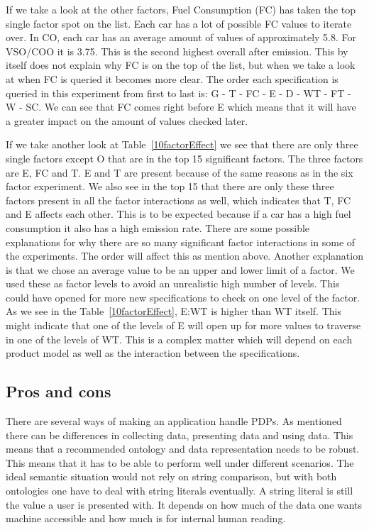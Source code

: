 \documentclass{llncs}
\begin{document}
If we take a look at the other factors, Fuel Consumption (FC) has
taken the top single factor spot on the list.  Each car has a lot of 
possible FC values to iterate
over. In CO, each car has an average amount of values of approximately
5.8. For VSO/COO it is 3.75.  This is the second highest overall after
emission. This by itself does not explain why FC is on the top of the
list, but when we take a look at when FC is queried it becomes more
clear. The order each specification is queried in this experiment 
from first to last is: G - T - FC - E - D - WT - FT - W - SC.  We can
see that FC comes right before E which means that it will have a
greater impact on the amount of values checked later. 

If we take another look at Table~\ref{10factorEffect} we see that
there are only three single factors except O that are in the top 15
significant factors. The three factors are E, FC and T. E and T
are present because of the same reasons as in the six factor
experiment. We also see in the top 15 that there are only these three
factors present in all the factor interactions as well, which
indicates that T, FC and E affects each other. This is to be expected
because if a car has a high fuel consumption it also has a high
emission rate. There are some possible explanations for why there are
so many significant factor interactions in some of the
experiments. The order will affect this as mention above. Another
explanation is that we chose an average value to be an upper and lower
limit of a factor. We used these as factor levels to avoid an
unrealistic high number of levels. This could have opened for more new
specifications to check on one level of the factor.  As we see in the
Table~\ref{10factorEffect}, \textsf{E:WT} is higher than \textsf{WT}
itself. This might indicate that one of the levels of E will open up
for more values to traverse in one of the levels of WT. This is a
complex matter which will depend on each product model as well as the
interaction between the specifications.

\subsection{Pros and cons}
There are several ways of making an application handle PDPs. As
mentioned there can be differences in collecting data, presenting data
and using data. This means that a recommended ontology and data
representation needs to be robust. This means that it has to be able
to perform well under different scenarios.  The ideal semantic
situation would not rely on string comparison, but with both
ontologies one have to deal with string literals eventually. A string
literal is still the value a user is presented with.  It depends on
how much of the data one wants machine accessible and how much is for
internal human reading.
\end{document}
